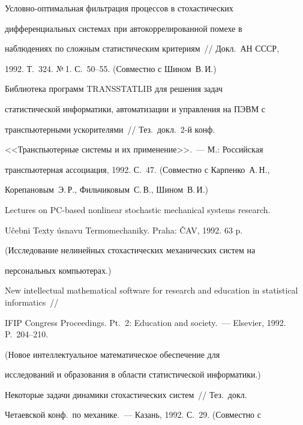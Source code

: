 




 Условно-оптимальная фильтрация процессов в стохастических


дифференциальных системах при автокоррелированной помехе в


наблюдениях по сложным статистическим критериям~// Докл.\ АН СССР,


1992. Т.~324. №\,1. С.~50--55. (Совместно с Шином~В.\,И.)





 Библиотека программ TRANSSTATLIB для решения задач


статистической информатики, автоматизации и управления на ПЭВМ с


транспьютерными ускорителями~// Тез.\ докл.\ 2-й конф.\


<<Транспьютерные системы и их применение>>.~--- М.: Российская


транспьютерная ассоциация, 1992. С.~47. (Совместно с Карпенко~А.\,Н.,


Корепановым~Э.\,Р., Фильчиковым~С.\,В., Шином~В.\,И.)





Lectures on PC-based nonlinear stochastic mechanical systems research.


U\^{c}ebni Texty \'{u}snavu Termomechaniky. Praha: \v{C}AV, 1992. 63 p.


 (Исследование нелинейных стохастических механических систем на


персональных компьютерах.)





New intellectual mathematical software for research and education in statistical informatics~//


IFIP Congress Proceedings. Pt.~2: Education and society.~--- Elsevier, 1992. P.~204--210.


(Новое интеллектуальное математическое обеспечение для


исследований и образования в области статистической информатики.)





Некоторые задачи динамики стохастических систем~// Тез.\ докл.\


Четаевской конф.\ по механике.~--- Казань, 1992. С.~29. (Совместно с


